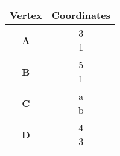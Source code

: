 \begin{tabular}[12pt]{ |c| c|}
    \hline
    \textbf{Vertex} & \textbf{Coordinates}\\ 
    \hline
    \textbf{A} & \myvec{3 \\ 1} \\
    \hline 
    \textbf{B} & \myvec{5 \\ 1}\\
    \hline
    \textbf{C} & \myvec{a \\ b}\\
    \hline
    \textbf{D} & \myvec{4 \\ 3}\\
    \hline
    \end{tabular}
